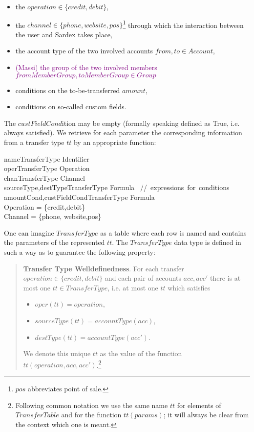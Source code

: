 \begin{itemize}
	\item the $operation \in \{credit, debit\}$,
	\item the $channel \in \{phone,website,pos\}$\footnote{$pos$ abbreviates point of sale.} through which the interaction between the user and Sardex takes place,
	\item the account type of the two involved accounts $from,to \in Account$,
	\item \textcolor{purple}{(Massi) the group of the two involved members $fromMemberGroup,toMemberGroup \in Group$ }
	\item conditions on the to-be-transferred $amount$, 
	\item conditions on so-called custom fields.
\end{itemize}

The $custFieldCond$ition may be empty (formally speaking defined as True, i.e. always satisfied). We retrieve for each parameter the corresponding information from a transfer type $tt$ by an appropriate function:

\begin{asm}
name\colon TransferType \rightarrow Identifier \\
oper\colon TransferType \rightarrow Operation\\
chan\colon TransferType \rightarrow Channel \\
sourceType,destType\colon TransferType \rightarrow Formula 
       \mbox{ // expressions for conditions}\\
amountCond,custFieldCond\colon TransferType \rightarrow Formula\\
\WHERE \+
    Operation = \{credit,debit\} \\
    Channel = \{phone, website,pos\}
\end{asm} 

One can imagine $TransferType$ as a table where each row is named and contains the parameters of the represented $tt$. The $TransferType$ data type is defined in such a way as to guarantee the following property: 
\begin{quote} 
	{\bf Transfer Type Welldefinedness}. For each transfer $operation \in \{credit,debit\}$ and each pair of accounts $acc,acc'$ there is at most one $tt \in TransferType$, i.e. at most one $tt$ which satisfies
	\begin{itemize}
		\item $oper(tt) = operation$,
		\item $sourceType(tt)=accountType(acc)$,
		\item $destType(tt)=accountType(acc')$.
	\end{itemize} 
We denote this unique $tt$ as the value of the function $tt(operation,acc,acc')$.\footnote{Following common notation we use the same name $tt$ for elements of $TransferTable$ and for the function $tt(params)$; it will always be clear from the context which one is meant.}
\end{quote}

